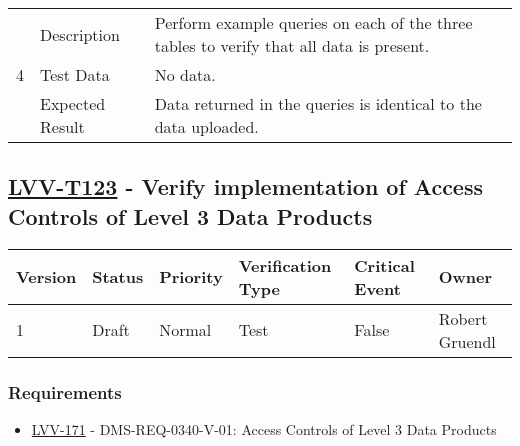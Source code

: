\begin{longtable}[]{p{1.3cm}p{2cm}p{13cm}}
            \multirow{3}{*}{ 4 } & Description &
            \begin{minipage}[t]{13cm}{\footnotesize
            Perform example queries on each of the three tables to verify that all
data is present.

            \vspace{\dp0}
            } \end{minipage} \\ \cline{2-3}
            & Test Data &
            \begin{minipage}[t]{13cm}{\footnotesize
                No data.
                \vspace{\dp0}
            } \end{minipage} \\ \cline{2-3}
            & Expected Result &
                \begin{minipage}[t]{13cm}{\footnotesize
                Data returned in the queries is identical to the data uploaded.

                \vspace{\dp0}
                } \end{minipage}
        \\ \midrule
    \end{longtable}

\subsection{\href{https://jira.lsstcorp.org/secure/Tests.jspa\#/testCase/LVV-T123}{LVV-T123}
    - Verify implementation of Access Controls of Level 3 Data Products}\label{lvv-t123}

\begin{longtable}[]{llllll}
\toprule
Version & Status & Priority & Verification Type & Critical Event & Owner
\\\midrule
1 & Draft & Normal &
Test & False & Robert Gruendl
\\\bottomrule
\end{longtable}

\subsubsection{Requirements}
\begin{itemize}
\item \href{https://jira.lsstcorp.org/browse/LVV-171}{LVV-171} - DMS-REQ-0340-V-01: Access Controls of Level 3 Data Products
\end{itemize}

